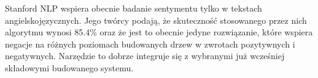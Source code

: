 Stanford NLP wspiera obecnie badanie sentymentu tylko w tekstach angielskojęzycznych. Jego twórcy podają, że skuteczność stosowanego przez nich algorytmu wynosi 85.4\% oraz że jest to obecnie jedyne rozwiązanie, które wspiera negacje na różnych poziomach budowanych drzew w zwrotach pozytywnych i negatywnych. Narzędzie to dobrze integruje się z wybranymi już wcześniej składowymi budowanego systemu.